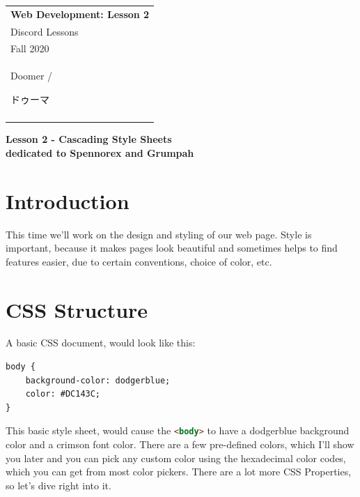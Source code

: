 \documentclass[a4paper,12pt]{article}
\newcommand{\selfjp}{\begin{CJK*}{UTF8}{min}ドゥーマ\end{CJK*}}
\newcommand{\htmlelem}[1]{\lstinline[columns=fixed,language=HTML]{#1}}
\begin{document}
\thispagestyle{empty} 

\begin{tabular}{p{15.5cm}} 
{\large \bf Web Development: Lesson 2} \\
Discord Lessons\\ Fall 2020\\ Doomer / \selfjp \\
\hline
\\
\end{tabular}

\vspace*{0.3cm}

\begin{center}
	{\Large \bf Lesson 2 - Cascading Style Sheets}
	\vspace{2mm}\\
	{\bf dedicated to Spennorex and Grumpah}
		
\end{center}  

\vspace{0.4cm}

\section{Introduction}
This time we'll work on the design and styling of our web page. Style is important, because it makes pages look beautiful and sometimes helps to find features easier, due to certain conventions, choice of color, etc. 

\section{CSS Structure}
A basic CSS document, would look like this:

\begin{lstlisting}[caption=Sample CSS Script,label={lst:sample_1}]
body {
    background-color: dodgerblue;
    color: #DC143C;
}
\end{lstlisting}
This basic style sheet, would cause the \htmlelem{<body>} to have a dodgerblue background color and a crimson font color. There are a few pre-defined colors, which I'll show you later and you can pick any custom color using the hexadecimal color codes, which you can get from most color pickers. There are a lot more CSS Properties, so let's dive right into it.
\end{document}

